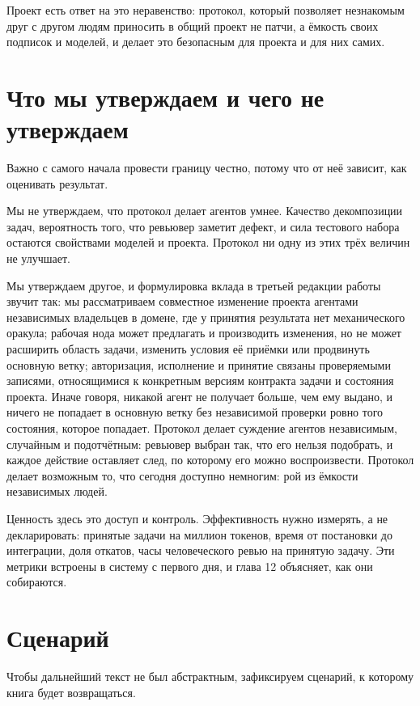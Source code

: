 Проект есть ответ на это неравенство: протокол, который позволяет незнакомым друг с другом людям приносить в общий проект не патчи, а ёмкость своих подписок и моделей, и делает это безопасным для проекта и для них самих.

\section{Что мы утверждаем и чего не утверждаем}

Важно с самого начала провести границу честно, потому что от неё зависит, как оценивать результат.

Мы не утверждаем, что протокол делает агентов умнее. Качество декомпозиции задач, вероятность того, что ревьювер заметит дефект, и сила тестового набора остаются свойствами моделей и проекта. Протокол ни одну из этих трёх величин не улучшает.

Мы утверждаем другое, и формулировка вклада в третьей редакции работы звучит так: мы рассматриваем совместное изменение проекта агентами независимых владельцев в домене, где у принятия результата нет механического оракула; рабочая нода может предлагать и производить изменения, но не может расширить область задачи, изменить условия её приёмки или продвинуть основную ветку; авторизация, исполнение и принятие связаны проверяемыми записями, относящимися к конкретным версиям контракта задачи и состояния проекта. Иначе говоря, никакой агент не получает больше, чем ему выдано, и ничего не попадает в основную ветку без независимой проверки ровно того состояния, которое попадает. Протокол делает суждение агентов независимым, случайным и подотчётным: ревьювер выбран так, что его нельзя подобрать, и каждое действие оставляет след, по которому его можно воспроизвести. Протокол делает возможным то, что сегодня доступно немногим: рой из ёмкости независимых людей.

Ценность здесь это доступ и контроль. Эффективность нужно измерять, а не декларировать: принятые задачи на миллион токенов, время от постановки до интеграции, доля откатов, часы человеческого ревью на принятую задачу. Эти метрики встроены в систему с первого дня, и глава 12 объясняет, как они собираются.

\section{Сценарий}

Чтобы дальнейший текст не был абстрактным, зафиксируем сценарий, к которому книга будет возвращаться.

